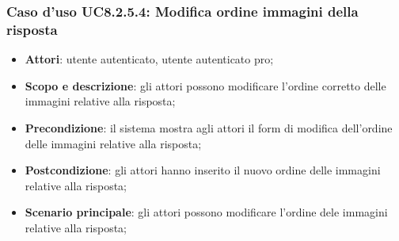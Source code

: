 \subsubsection{Caso d’uso UC8.2.5.4: Modifica ordine immagini della risposta}
\begin{itemize}
	\item\textbf{Attori}: utente autenticato, utente autenticato pro;
	\item\textbf{Scopo e descrizione}: gli attori possono modificare l'ordine corretto delle immagini relative alla risposta;
	\item\textbf{Precondizione}: il sistema mostra agli attori il form di modifica dell'ordine delle immagini relative alla risposta; 
	\item \textbf{Postcondizione}: gli attori hanno inserito il nuovo ordine delle immagini relative alla risposta;
	\item\textbf{Scenario principale}: gli attori possono modificare l'ordine dele immagini relative alla risposta;
\end{itemize}